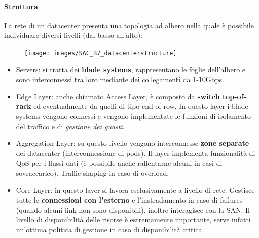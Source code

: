 \documentclass{article}
\providecommand{\tightlist}{%
		  \setlength{\itemsep}{0pt}\setlength{\parskip}{0pt}}
\begin{document}
		\paragraph{Struttura}\label{struttura}
		La rete di un datacenter presenta una topologia ad albero nella
		quale è possibile individuare diversi livelli (dal basso all'alto):
		
		\begin{figure}[ht]
			\centering
			\texttt{[image: images/SAC\_B7\_datacenterstructure]}
		\end{figure}
		
		
		\begin{itemize}
		\tightlist
		\item
		  Servers: si tratta dei \textbf{blade systems}, rappresentano le foglie dell'albero e sono interconnessi tra loro mediante dei collegamenti da 1-10Gbps.
		\item
		  Edge Layer: anche chiamato Access Layer, è composto da \textbf{switch top-of-rack} ed eventualmente da quelli di tipo end-of-row. In questo layer i blade systems vengono connessi e vengono implementate le funzioni di isolamento del traffico e di \emph{gestione dei guasti}.
		\item
		  Aggregation Layer: su questo livello vengono interconnesse \textbf{zone separate} dei datacenter (interconnessione di pods). Il layer implementa funzionalità di QoS per i flussi dati (è possibile anche rallentarne alcuni in casi di sovraccarico). Traffic shaping in caso di overload.
		\item
		  Core Layer: in questo layer si lavora esclusivamente a livello di rete. Gestisce tutte le \textbf{connessioni con l'esterno} e
		  l'instradamento in caso di failures (quando alcuni link non sono disponibili), inoltre interagisce con la SAN. Il livello di disponibilità delle risorse è estremamente importante, serve infatti un'ottima politica di gestione in caso di
		  disponibilità critica.
		\end{itemize}
		
\end{document}
